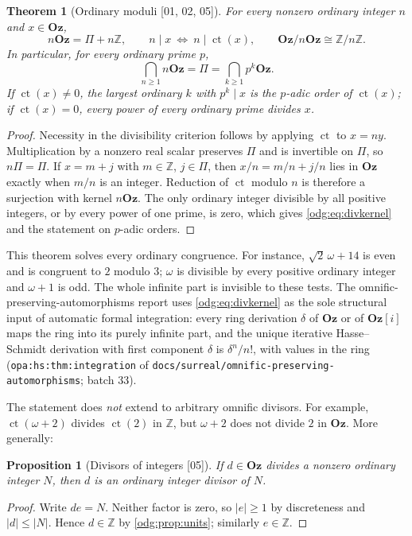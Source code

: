 \documentclass[11pt,oneside]{article}
\numberwithin{equation}{section}
\newtheorem{theorem}{Theorem}[section]
\newtheorem{proposition}[proposition]{Proposition}
\theoremstyle{definition}
\theoremstyle{remark}
\newcommand{\Oz}{\mathbf{Oz}}
\newcommand{\Z}{\mathbb Z}
\newcommand{\ct}{\operatorname{ct}}
\newcommand{\src}[1]{\textup{\textsf{\small[#1]}}}
\newcommand{\replabel}[1]{\nolinkurl{#1}}
\newcommand{\fn}[1]{\nolinkurl{#1}}
\newcommand{\Og}{\Oz[i]}
\begin{document}
\begin{theorem}[Ordinary moduli \src{01, 02, 05}]\label{odg:thm:finitequotients}\label{odg:eq:nA}
For every nonzero ordinary integer $n$ and $x\in\Oz$,
\begin{equation}\label{odg:eq:nOz}
 n\Oz=\Pi+n\Z,\qquad
 n\mid x\ \Longleftrightarrow\ n\mid\ct(x),\qquad
 \Oz/n\Oz\cong\Z/n\Z.
\end{equation}
In particular, for every ordinary prime $p$,
\begin{equation}\label{odg:eq:divkernel}
 \bigcap_{n\geq1}n\Oz=\Pi=\bigcap_{k\geq1}p^k\Oz .
\end{equation}
If $\ct(x)\ne0$, the largest ordinary $k$ with $p^k\mid x$ is the $p$-adic
order of $\ct(x)$; if $\ct(x)=0$, every power of every ordinary prime
divides $x$.
\end{theorem}
\begin{proof}
Necessity in the divisibility criterion follows by applying $\ct$ to $x=ny$.
Multiplication by a nonzero real scalar preserves $\Pi$ and is invertible
on $\Pi$, so $n\Pi=\Pi$. If $x=m+j$ with $m\in\Z$, $j\in\Pi$, then
$x/n=m/n+j/n$ lies in $\Oz$ exactly when $m/n$ is an integer. Reduction of
$\ct$ modulo $n$ is therefore a surjection with kernel $n\Oz$. The only
ordinary integer divisible by all positive integers, or by every power of one
prime, is zero, which gives \eqref{odg:eq:divkernel} and the statement on
$p$-adic orders.
\end{proof}

This theorem solves every ordinary congruence. For instance,
$\sqrt2\,\omega+14$ is even and is congruent to $2$ modulo $3$; $\omega$ is
divisible by every positive ordinary integer and $\omega+1$ is odd. The
whole infinite part is invisible to these tests.
The omnific-preserving-automorphisms report uses \eqref{odg:eq:divkernel} as
the sole structural input of automatic formal integration: every ring
derivation $\delta$ of $\Oz$ or of $\Og$ maps the ring into its purely
infinite part, and the unique iterative Hasse--Schmidt derivation with first
component $\delta$ is $\delta^n/n!$, with values in the ring
(\replabel{opa:hs:thm:integration} of
\fn{docs/surreal/omnific-preserving-automorphisms}; batch 33).

The statement does \emph{not} extend to arbitrary omnific divisors.
For example, $\ct(\omega+2)$ divides $\ct(2)$ in $\Z$, but $\omega+2$
does not divide $2$ in $\Oz$. More generally:

\begin{proposition}[Divisors of integers \src{05}]\label{odg:prop:finitedivisors}
If $d\in\Oz$ divides a nonzero ordinary integer $N$, then $d$ is an
ordinary integer divisor of $N$.
\end{proposition}
\begin{proof}
Write $de=N$. Neither factor is zero, so $|e|\ge1$ by discreteness and
$|d|\le|N|$. Hence $d\in\Z$ by \cref{odg:prop:units}; similarly $e\in\Z$.
\end{proof}
\end{document}
